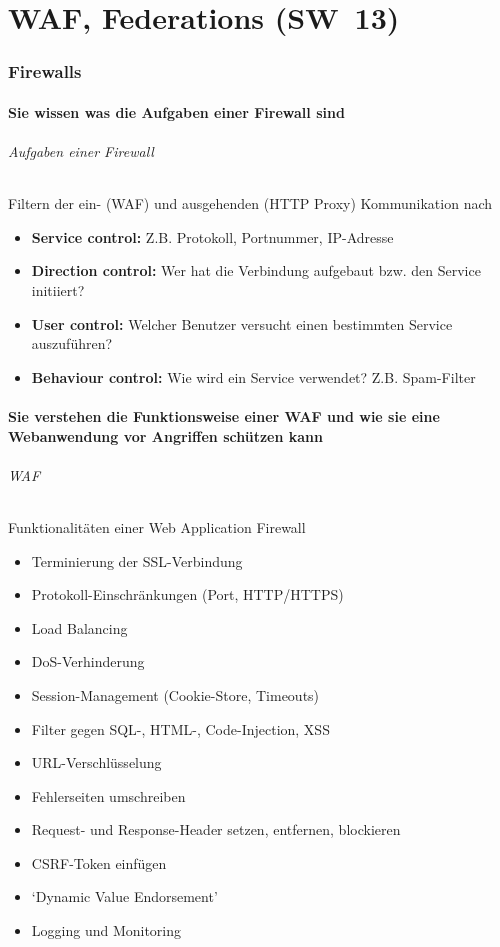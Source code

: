 \documentclass[10pt,a4paper]{article}
\begin{document}
\part{WAF, Federations (SW~13)}
\section{Firewalls}
\subsection*{Sie wissen was die Aufgaben einer Firewall sind}
\paragraph*{Aufgaben einer Firewall}Filtern der ein- (WAF) und ausgehenden (HTTP Proxy) Kommunikation nach
\begin{itemize}[noitemsep,topsep=0pt,leftmargin=*]
    \item \textbf{Service control:} Z.B. Protokoll, Portnummer, IP-Adresse
    \item \textbf{Direction control:} Wer hat die Verbindung aufgebaut bzw. den Service initiiert?
    \item \textbf{User control:} Welcher Benutzer versucht einen bestimmten Service auszuführen?
    \item \textbf{Behaviour control:} Wie wird ein Service verwendet? Z.B. Spam-Filter
\end{itemize}

\subsection*{Sie verstehen die Funktionsweise einer WAF und wie sie eine Webanwendung vor Angriffen schützen kann}
\paragraph*{WAF}Funktionalitäten einer Web Application Firewall
\begin{itemize}[noitemsep,topsep=0pt,leftmargin=*]
    \item Terminierung der SSL-Verbindung
    \item Protokoll-Einschränkungen (Port, HTTP/HTTPS)
    \item Load Balancing
    \item DoS-Verhinderung
    \item Session-Management (Cookie-Store, Timeouts)
    \item Filter gegen SQL-, HTML-, Code-Injection, XSS
    \item URL-Verschlüsselung
    \item Fehlerseiten umschreiben
    \item Request- und Response-Header setzen, entfernen, blockieren
    \item CSRF-Token einfügen
    \item `Dynamic Value Endorsement'
    \item Logging und Monitoring
\end{itemize}
\end{document}
